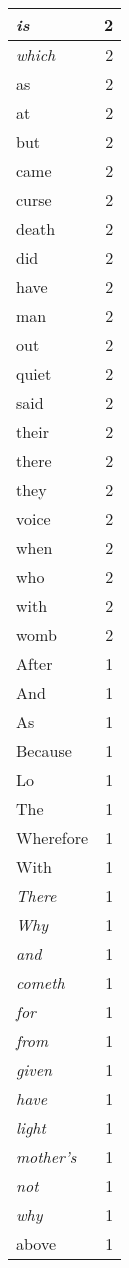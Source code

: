 \begin{center}
\begin{longtable}{l|r}
\emph{is} & 2 \\ \hline
\emph{which} & 2 \\ \hline
as & 2 \\ \hline
at & 2 \\ \hline
but & 2 \\ \hline
came & 2 \\ \hline
curse & 2 \\ \hline
death & 2 \\ \hline
did & 2 \\ \hline
have & 2 \\ \hline
man & 2 \\ \hline
out & 2 \\ \hline
quiet & 2 \\ \hline
said & 2 \\ \hline
their & 2 \\ \hline
there & 2 \\ \hline
they & 2 \\ \hline
voice & 2 \\ \hline
when & 2 \\ \hline
who & 2 \\ \hline
with & 2 \\ \hline
womb & 2 \\ \hline
After & 1 \\ \hline
And & 1 \\ \hline
As & 1 \\ \hline
Because & 1 \\ \hline
Lo & 1 \\ \hline
The & 1 \\ \hline
Wherefore & 1 \\ \hline
With & 1 \\ \hline
\emph{There} & 1 \\ \hline
\emph{Why} & 1 \\ \hline
\emph{and} & 1 \\ \hline
\emph{cometh} & 1 \\ \hline
\emph{for} & 1 \\ \hline
\emph{from} & 1 \\ \hline
\emph{given} & 1 \\ \hline
\emph{have} & 1 \\ \hline
\emph{light} & 1 \\ \hline
\emph{mother's} & 1 \\ \hline
\emph{not} & 1 \\ \hline
\emph{why} & 1 \\ \hline
above & 1 \\ \hline

\end{longtable}
\end{center}
